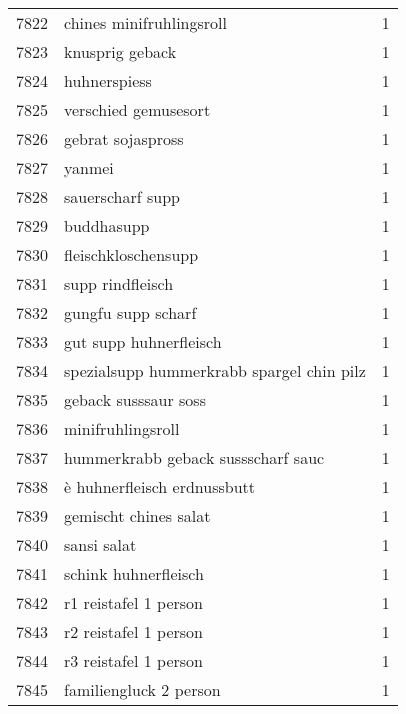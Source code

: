 \begin{tabular}{llr}
7822 &                           chines minifruhlingsroll &      1 \\
7823 &                                    knusprig geback &      1 \\
7824 &                                       huhnerspiess &      1 \\
7825 &                               verschied gemusesort &      1 \\
7826 &                                  gebrat sojaspross &      1 \\
7827 &                                             yanmei &      1 \\
7828 &                                   sauerscharf supp &      1 \\
7829 &                                         buddhasupp &      1 \\
7830 &                                fleischkloschensupp &      1 \\
7831 &                                   supp rindfleisch &      1 \\
7832 &                                 gungfu supp scharf &      1 \\
7833 &                             gut supp huhnerfleisch &      1 \\
7834 &          spezialsupp hummerkrabb spargel chin pilz &      1 \\
7835 &                               geback susssaur soss &      1 \\
7836 &                                  minifruhlingsroll &      1 \\
7837 &                 hummerkrabb geback sussscharf sauc &      1 \\
7838 &                        è huhnerfleisch erdnussbutt &      1 \\
7839 &                              gemischt chines salat &      1 \\
7840 &                                        sansi salat &      1 \\
7841 &                               schink huhnerfleisch &      1 \\
7842 &                              r1 reistafel 1 person &      1 \\
7843 &                              r2 reistafel 1 person &      1 \\
7844 &                              r3 reistafel 1 person &      1 \\
7845 &                             familiengluck 2 person &      1 \\

\end{tabular}
